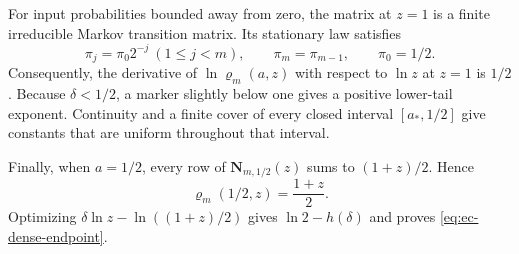 For input probabilities bounded away from zero, the matrix at $z=1$ is a
finite irreducible Markov transition matrix.  Its stationary law satisfies
\begin{equation}
 \pi_j=\pi_0 2^{-j}\ (1\leq j<m),\qquad
 \pi_m=\pi_{m-1},\qquad \pi_0=1/2.
 \label{eq:ec-stationary-law}
\end{equation}
Consequently, the derivative of $\ln\varrho_m(a,z)$ with respect to $\ln z$
at $z=1$ is $1/2$.  Because $\delta<1/2$, a marker slightly below one gives
a positive lower-tail exponent.  Continuity and a finite cover of every
closed interval $[a_*,1/2]$ give constants that are uniform throughout that
interval.

Finally, when $a=1/2$, every row of $\mathbf N_{m,1/2}(z)$ sums to
$(1+z)/2$.  Hence
\begin{equation}
 \varrho_m(1/2,z)=\frac{1+z}{2}.
\end{equation}
Optimizing $\delta\ln z-\ln((1+z)/2)$ gives
$\ln2-h(\delta)$ and proves \eqref{eq:ec-dense-endpoint}.
